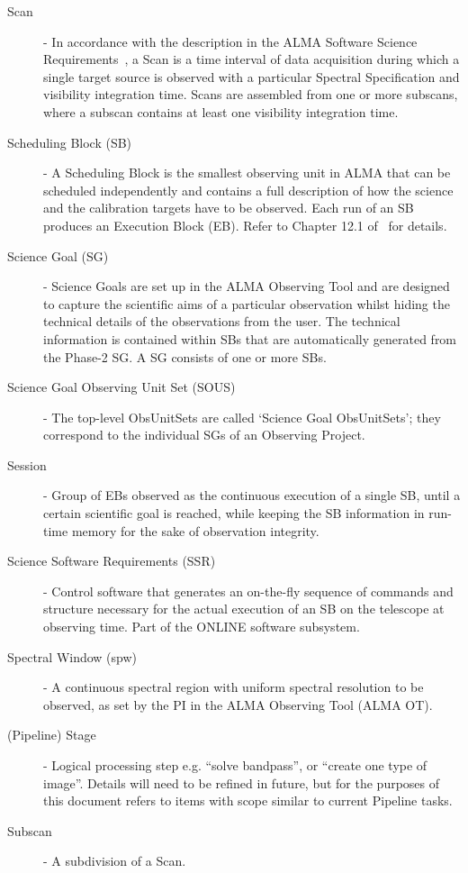 \begin{description}
\item[Scan] - In accordance with the description in the ALMA Software Science Requirements~\cite{SSRdoc}, a Scan is a time interval of data acquisition during which a single target source is observed with a particular Spectral Specification and visibility integration time. Scans are assembled from one or more subscans, where a subscan contains at least one visibility integration time.
\item[Scheduling Block (SB)] - A Scheduling Block is the smallest observing unit in ALMA that can be scheduled independently and contains a full description of how the science and the calibration targets have to be observed. Each run of an SB produces an Execution Block (EB). Refer to Chapter 12.1 of~\cite{c12_thb} for details.
\item[Science Goal (SG)] -  Science Goals are set up in the ALMA Observing Tool and are designed to capture the scientific aims of a particular observation whilst hiding the technical details of the observations from the user. The technical information is contained within SBs that are automatically generated from the Phase-2 SG. A SG consists of one or more SBs.
\item[Science Goal Observing Unit Set (SOUS)] - The top-level ObsUnitSets are called `Science Goal ObsUnitSets’; they correspond to the individual SGs of an Observing Project. 
\item[Session] - Group of EBs observed as the continuous execution of a single SB, until a certain scientific goal is reached, while keeping the SB information in run-time memory for the sake of observation integrity.
\item[Science Software Requirements (SSR)] - Control software that generates an on-the-fly sequence of commands and structure necessary for the actual execution of an SB on the telescope at observing time. Part of the ONLINE software subsystem.
\item[Spectral Window (spw)] - A continuous spectral region with uniform spectral resolution to be observed, as set by the PI in the ALMA Observing Tool (ALMA OT).
\item[(Pipeline) Stage] - Logical processing step e.g. ``solve bandpass'', or ``create one type of image''. Details will need to be refined in future, but for the purposes of this document refers to items with scope similar to current Pipeline tasks.
\item[Subscan] - A subdivision of a Scan.

\end{description}
